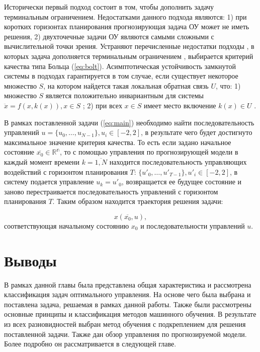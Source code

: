  Исторически первый подход состоит в том, чтобы дополнить задачу  терминальным ограничением. Недостатками данного подхода являются: 1) при коротких горизонтах планирования прогнозирующая задача ОУ может не иметь решения, 2) двухточечные задачи ОУ являются самыми сложными с вычислительной точки зрения. Устраняют перечисленные недостатки подходы \cite{mpcIn2}, в которых задача дополняется
терминальным ограничением , выбирается критерий качества типа Больца (\ref{eq:bolt}). Асимптотическая устойчивость замкнутой системы в подходах \cite{mpcIn2} гарантируется в том случае, если существует некоторое множество $S$, на котором найдется такая локальная обратная связь $U$, что: 1) множество $S$ является положительно инвариантным для системы $\ddot{x} =  f (x, k (x)), x \in S$ ; 2) при всех $x \in S$ имеет место включение $k(x) \in U$ .

В рамках поставленной задачи (\ref{eq:main}) необходимо найти последовательность управлений $u = \{u_0, \dots , u_{N-1} \}, u_i \in [-2, 2]$, в результате чего будет достигнуто максимальное значение критерия качества. То есть если задано начальное состояние $\overline{x_0}\in \mathbb{R^n}$, то с помощью управления по прогнозирующей модели в каждый момент времени $k=\overline{1, N}$ находится последовательность управляющих воздействий  с горизонтом планирования $T$: $\{u'_0, \dots , u'_{T-1}\}, u'_i \in [-2, 2]$, в систему подается управление $u_k = u'_0$, возвращается ее будущее состояние и заново перестраивается последовательность управлений с  горизонтом планирования $T$. Таким образом находится траектория решения задачи:

$$x(\overline{x_0}, u) ,$$
соответствующая начальному состоянию $x_0$ и последовательности управлений $u$.

\section{Выводы}\label{1sec:conc}

В рамках данной главы была представлена общая характеристика и рассмотрена классификация задач оптимального управления. На основе чего была выбрана и поставлена задача, решаемая в рамках данной работы. Также были рассмотрены основные принципы и классификация методов машинного обучения. В результате из всех разновидностей выбран метод обучения с подкреплением для решения поставленной задачи. Также дан обзор управления по прогнозируемой модели. Более подробно он рассматривается в следующей главе.
